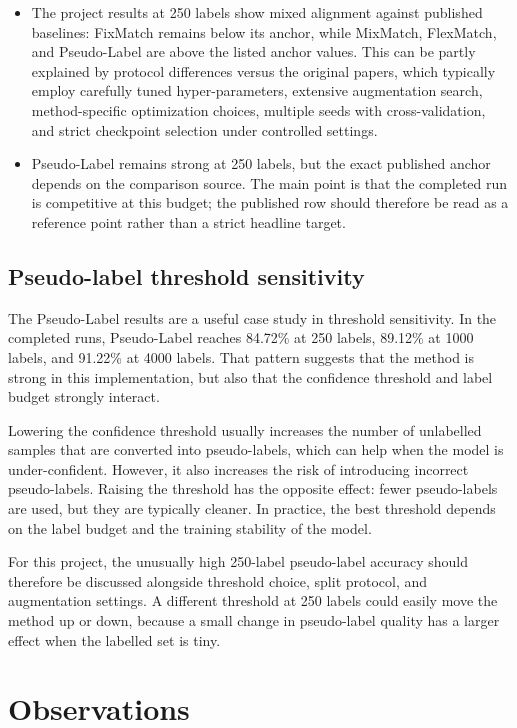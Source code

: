 \begin{itemize}
 \item The project results at 250 labels show mixed alignment against published baselines: FixMatch remains below its anchor, while MixMatch, FlexMatch, and Pseudo-Label are above the listed anchor values. This can be partly explained by protocol differences versus the original papers, which typically employ carefully tuned hyper-parameters, extensive augmentation search, method-specific optimization choices, multiple seeds with cross-validation, and strict checkpoint selection under controlled settings.
 \item Pseudo-Label remains strong at 250 labels, but the exact published anchor depends on the comparison source. The main point is that the completed run is competitive at this budget; the published row should therefore be read as a reference point rather than a strict headline target.
\end{itemize}

\subsection{Pseudo-label threshold sensitivity}

The Pseudo-Label results are a useful case study in threshold sensitivity. In the completed runs, Pseudo-Label reaches 84.72\% at 250 labels, 89.12\% at 1000 labels, and 91.22\% at 4000 labels. That pattern suggests that the method is strong in this implementation, but also that the confidence threshold and label budget strongly interact.

Lowering the confidence threshold usually increases the number of unlabelled samples that are converted into pseudo-labels, which can help when the model is under-confident. However, it also increases the risk of introducing incorrect pseudo-labels. Raising the threshold has the opposite effect: fewer pseudo-labels are used, but they are typically cleaner. In practice, the best threshold depends on the label budget and the training stability of the model.

For this project, the unusually high 250-label pseudo-label accuracy should therefore be discussed alongside threshold choice, split protocol, and augmentation settings. A different threshold at 250 labels could easily move the method up or down, because a small change in pseudo-label quality has a larger effect when the labelled set is tiny.

\section{Observations}

